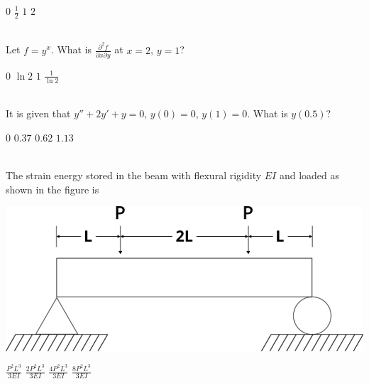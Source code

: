 \documentclass[addpoints,11pt]{exam}
\begin{document}
\begin{questions}
        \begin{oneparchoices}
            \choice $0$
            \choice $\frac{1}{2}$
            \choice $1$
            \choice $2$
        \end{oneparchoices}\\
        
        \question Let $f = y^x$. What is $\frac{\partial^2 f}{\partial{x}\partial{y}}$ at $x=2$, $y=1$?\\

        \begin{oneparchoices}
            \choice $0$
            \choice $\ln 2$
            \choice $1$
            \choice $\frac{1}{\ln 2}$
        \end{oneparchoices}\\

        \question It is given that $y'' + 2y' + y=0$, $y(0)=0$, $y(1)=0$. What is $y(0.5)$?\\
        
        \begin{oneparchoices}
            \choice $0$
            \choice $0.37$
            \choice $0.62$
            \choice $1.13$
        \end{oneparchoices}\\

        \question The strain energy stored in the beam with flexural rigidity $EI$ and loaded as shown in the figure is\\

        \begin{center}
            \includegraphics[scale=0.5]{q30}
        \end{center}

        \begin{oneparchoices}
            \choice $\frac{P^2L^3}{3EI}$
            \choice $\frac{2P^2L^3}{3EI}$
            \choice $\frac{4P^2L^3}{3EI}$
            \choice $\frac{8P^2L^3}{3EI}$
        \end{oneparchoices}\\


\end{questions}
\end{document}
